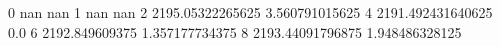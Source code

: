 0 nan nan
1 nan nan
2 2195.05322265625 3.560791015625
4 2191.492431640625 0.0
6 2192.849609375 1.357177734375
8 2193.44091796875 1.948486328125

